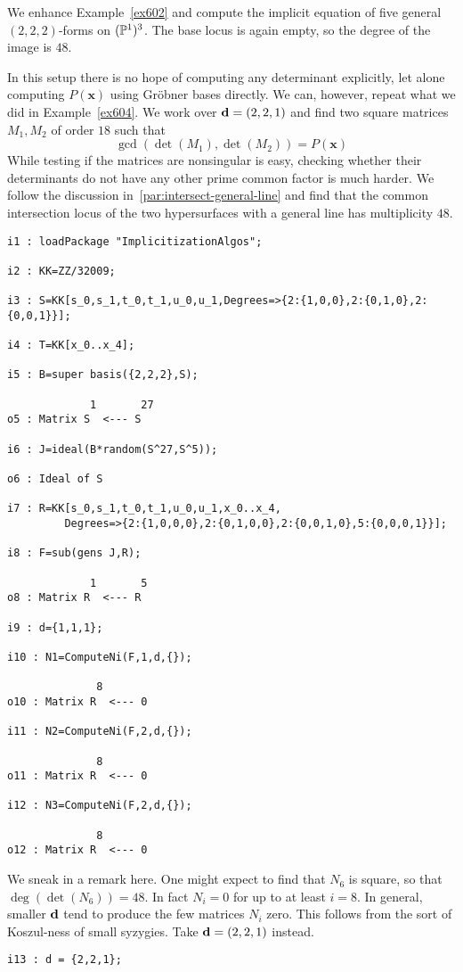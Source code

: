 \documentclass[fleqn,reqno]{amsart}
\begin{document}
\begin{example}[$\mt{ex603}$]
\label{ex603}
We enhance Example~\ref{ex602} and compute the implicit equation of five general
$(2,2,2)$-forms on $(\mathbb{P}^1)^3$.
The base locus is again empty, so the degree of the image is $48$.

In this setup there is no hope of computing any determinant explicitly,
let alone computing $P(\mathbf x)$ using Gr\"obner bases directly.
We can, however, repeat what we did in Example~\ref{ex604}.
We work over $\mathbf d=(2,2,1)$ and find two square matrices $M_1,M_2$ of order $18$
such that
\[
	\gcd(\det(M_1),\det(M_2))=P(\mathbf x)
\]
While testing if the matrices are nonsingular is easy,
checking whether their determinants do not have any other prime common factor
is much harder.
We follow the discussion in~\eqref{par:intersect-general-line} and find
that the common intersection locus of the two hypersurfaces with a general line
has multiplicity $48$.
\begin{verbatim}
i1 : loadPackage "ImplicitizationAlgos";

i2 : KK=ZZ/32009;

i3 : S=KK[s_0,s_1,t_0,t_1,u_0,u_1,Degrees=>{2:{1,0,0},2:{0,1,0},2:{0,0,1}}];

i4 : T=KK[x_0..x_4];

i5 : B=super basis({2,2,2},S);

             1       27
o5 : Matrix S  <--- S

i6 : J=ideal(B*random(S^27,S^5));

o6 : Ideal of S

i7 : R=KK[s_0,s_1,t_0,t_1,u_0,u_1,x_0..x_4,
         Degrees=>{2:{1,0,0,0},2:{0,1,0,0},2:{0,0,1,0},5:{0,0,0,1}}];

i8 : F=sub(gens J,R);

             1       5
o8 : Matrix R  <--- R

i9 : d={1,1,1};

i10 : N1=ComputeNi(F,1,d,{});

              8
o10 : Matrix R  <--- 0

i11 : N2=ComputeNi(F,2,d,{});

              8
o11 : Matrix R  <--- 0

i12 : N3=ComputeNi(F,2,d,{});

              8
o12 : Matrix R  <--- 0
\end{verbatim}
We sneak in a remark here.
One might expect to find that $N_6$ is square, so that $\deg(\det(N_6))=48$.
In fact $N_i=0$ for up to at least $i=8$.
In general, smaller $\mathbf d$ tend to produce the few matrices $N_i$ zero.
This follows from the sort of Koszul-ness of small syzygies.
Take $\mathbf d=(2,2,1)$ instead.
\begin{verbatim}
i13 : d = {2,2,1};


\end{verbatim}
\end{example}
\end{document}
